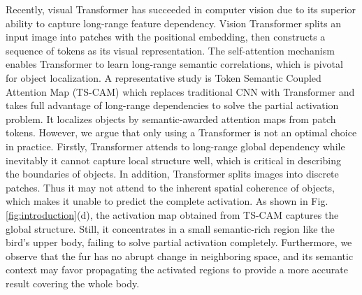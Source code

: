 \documentclass[runningheads]{llncs}
\begin{document}
Recently, visual Transformer has succeeded in computer vision due to its superior ability to capture long-range feature dependency. 
Vision Transformer \cite{DBLP:journals/corr/abs-2103-13915} splits an input image into patches with the positional embedding, then constructs a sequence of tokens as its visual representation. 
The self-attention mechanism enables Transformer to learn long-range semantic correlations, which is pivotal for object localization. 
A representative study is Token Semantic Coupled Attention Map (TS-CAM) \cite{gao2021tscam} which replaces traditional CNN with Transformer and takes full advantage of long-range dependencies to solve the partial activation problem. 
It localizes objects by semantic-awarded attention maps from patch tokens. 
However, we argue that only using a Transformer is not an optimal choice in practice.
Firstly, Transformer attends to long-range global dependency while inevitably it cannot capture local structure well, which is critical in describing the boundaries of objects.
In addition, Transformer splits images into discrete patches. Thus it may not attend to the inherent spatial coherence of objects, which makes it unable to predict the complete activation.
As shown in Fig.\ref{fig:introduction}(d), the activation map obtained from TS-CAM captures the global structure. Still, it concentrates in a small semantic-rich region like the bird's upper body, failing to solve partial activation completely. 
Furthermore, we observe that the fur has no abrupt change in neighboring space, and its semantic context may favor propagating the activated regions to provide a more accurate result covering the whole body. 
\end{document}

